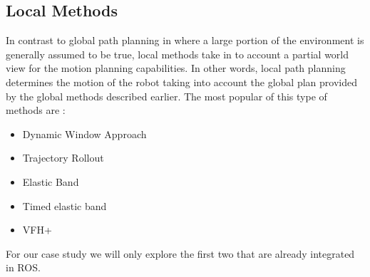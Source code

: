 \subsection{Local Methods}
In contrast to global path planning in where a large portion of the environment is generally assumed to be true, local methods take in to account a partial world view for the motion planning capabilities. In other words, local path planning determines the motion of the robot taking into account the global plan provided by the global methods described earlier.
The most popular of this type of methods are \cite{inbookdwa}:
\begin{itemize}
    \item Dynamic Window Approach
    \item Trajectory Rollout
    \item Elastic Band
    \item Timed elastic band
    \item VFH+
\end{itemize}
For our case study we will only explore the first two that are already integrated in ROS.
